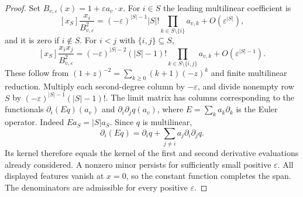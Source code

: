 \documentclass[11pt]{article}
\begin{document}
\begin{proof}
Set $B_{v,\varepsilon}(x)=1+\varepsilon a_v\cdot x$.
For $i\in S$ the leading multilinear coefficient is
\[
 [x_S]\frac{x_i}{B_{v,\varepsilon}^2}
 =(-\varepsilon)^{|S|-1}|S|!
       \prod_{k\in S\setminus\{i\}}a_{v,k}
   +O(\varepsilon^{|S|}),
\]
and it is zero if $i\notin S$. For $i<j$ with $\{i,j\}\subseteq S$,
\[
 [x_S]\frac{x_ix_j}{B_{v,\varepsilon}^2}
 =(-\varepsilon)^{|S|-2}(|S|-1)!
       \prod_{k\in S\setminus\{i,j\}}a_{v,k}
   +O(\varepsilon^{|S|-1}).
\]
These follow from $(1+z)^{-2}=\sum_{k\ge0}(k+1)(-z)^k$
and finite multilinear reduction. Multiply each second-degree column
by $-\varepsilon$, and divide nonempty row $S$ by
$(-\varepsilon)^{|S|-1}(|S|-1)!$.
The limit matrix has columns corresponding to the functionals
$\partial_i(Eq)(a_v)$ and $\partial_i\partial_jq(a_v)$, where
$E=\sum_k a_k\partial_k$ is the Euler operator.
Indeed $E a_S=|S|a_S$. Since $q$ is multilinear,
\[
 \partial_i(Eq)=\partial_iq+\sum_{j\ne i}a_j\partial_i\partial_jq.
\]
Its kernel therefore equals the kernel of the first and second derivative
evaluations already considered. A nonzero minor persists for sufficiently
small positive $\varepsilon$. All displayed features vanish at $x=0$,
so the constant function completes the span. The denominators are
admissible for every positive $\varepsilon$.
\end{proof}
\end{document}
